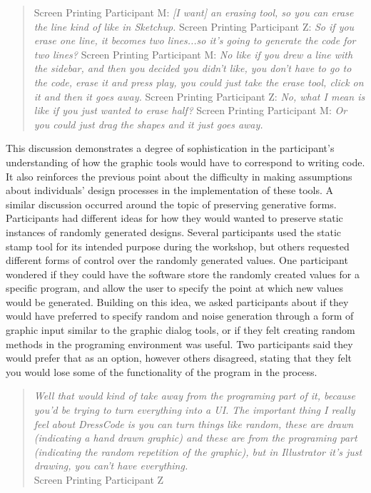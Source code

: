 \documentclass{sigchi}
\begin{document}
\begin{quotation}
Screen Printing Participant M: \textit{[I want] an erasing tool, so you can erase the line kind of like in Sketchup.}  
Screen Printing Participant Z: \textit{So if you erase one line, it becomes two lines...so it's going to generate the code for two lines?}
Screen Printing Participant M: \textit{No like if you drew a line with the sidebar, and then you decided you didn't like, you don't have to go to the code, erase it and press play, you could just take the erase tool, click on it and then it goes away.}
Screen Printing Participant Z:  \textit{No, what I mean is like if you just wanted to erase half?}
Screen Printing Participant M: \textit{Or you could just drag the shapes and it just goes away.}
\end{quotation}

This discussion demonstrates a degree of sophistication in the participant's understanding of how the graphic tools would have to correspond to writing code. It also reinforces the previous point about the difficulty in making assumptions about individuals' design processes in the implementation of these tools. A similar discussion occurred around the topic of preserving generative forms. Participants had different ideas for how they would wanted to preserve static instances of randomly generated designs. Several participants used the static stamp tool for its intended purpose during the workshop, but others requested different forms of control over the randomly generated values. One participant wondered if they could have the software store the randomly created values for a specific program, and allow the user to specify the point at which new values would be generated. Building on this idea, we asked participants about if they would have preferred to specify random and noise generation through a form of graphic input similar to the graphic dialog tools, or if they felt creating random methods in the programing environment was useful. Two participants said they would prefer that as an option, however others disagreed, stating that they felt you would lose some of the functionality of the program in the process.
\begin{quotation} 
\textit{Well that would kind of take away from the programing part of it, because you'd be trying to turn everything into a UI.
The important thing I really feel about DressCode is you can turn things like random, these are drawn (indicating a hand drawn graphic) and these are from the programing part (indicating the random repetition of the graphic), but in Illustrator it's just drawing, you can't have everything.}
\\Screen Printing Participant Z
\end{quotation}
\end{document}

